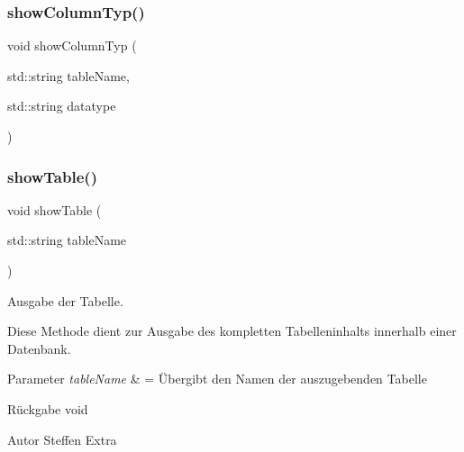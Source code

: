 \subsubsection{show\+Column\+Typ()}
{\footnotesize\ttfamily void show\+Column\+Typ (\begin{DoxyParamCaption}\item[{std\+::string}]{table\+Name,  }\item[{std\+::string}]{datatype }\end{DoxyParamCaption})}

\mbox{\label{tables_8cpp_a22fbeb7f18a00bafd4864de51a3bca28}} 
\subsubsection{show\+Table()}
{\footnotesize\ttfamily void show\+Table (\begin{DoxyParamCaption}\item[{std\+::string}]{table\+Name }\end{DoxyParamCaption})}



Ausgabe der Tabelle. 

Diese Methode dient zur Ausgabe des kompletten Tabelleninhalts innerhalb einer Datenbank.


\begin{DoxyParams}{Parameter}
{\em table\+Name} & = Übergibt den Namen der auszugebenden Tabelle\\
\hline
\end{DoxyParams}
\begin{DoxyReturn}{Rückgabe}
void
\end{DoxyReturn}
\begin{DoxyAuthor}{Autor}
Steffen Extra 
\end{DoxyAuthor}
